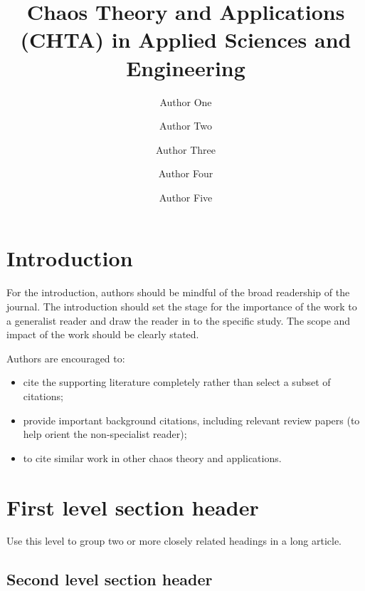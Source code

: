 \documentclass[9pt,twocolumn, twoside]{chaos}
\title{Chaos Theory and Applications (CHTA) in Applied Sciences and Engineering}
\author[$\ast$,1]{Author One\orcidA{}}
\author[$\alpha$,2]{Author Two\orcidB{}}
\author[$\beta$,3]{Author Three\orcidA{}}
\author[$\S$,4]{Author Four\orcidA{}}
\author[$\ast\ast$,5]{Author Five\orcidA{}}
\affil[$\ast$]{Author one affiliation}
\affil[$\alpha$]{Author two affiliation}
\affil[$\beta$]{Author three affiliation}
\affil[$\S$]{Author four affiliation}
\affil[$\ast\ast$]{Author five affiliation}
\begin{document}
	
	\maketitle
	
\setlength{\extrarowheight}{3pt}

	\thispagestyle{firststyle}
	\logomark
	\articletypemark
	\marginmark
	\firstpagefootnote
	
	
	\vspace{-44pt}
	
	\setcounter{page}{1}

	\section{Introduction}
	
	For the introduction, authors should be mindful of the broad readership of the journal. The introduction should set the stage for the importance of the work to a generalist reader and draw the reader in to the specific study. The scope and impact of the work should be clearly stated.
	
 
	Authors are encouraged to:
	
	\begin{itemize}
		\item cite the supporting literature completely rather than select a subset of citations;
		\item provide important background citations, including relevant review papers (to help orient the non-specialist reader);
		\item to cite similar work in other chaos theory and applications.
	\end{itemize}
	
	
	
		\section{First level section header}
	
	Use this level to group two or more closely related headings in a long article.
	
	\subsection{Second level section header}
	
\end{document}
